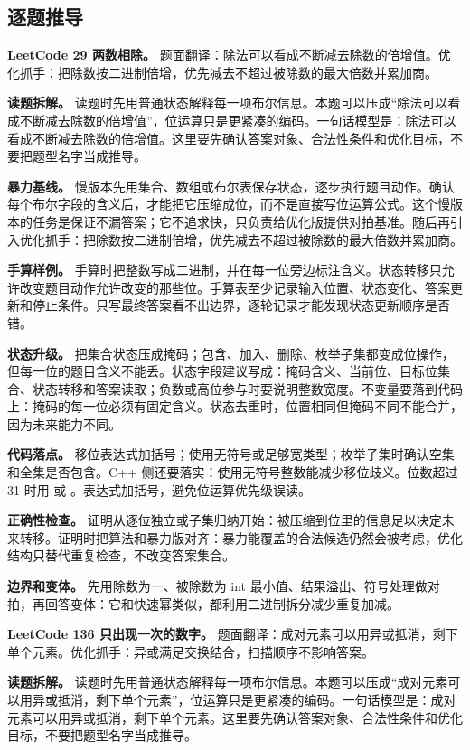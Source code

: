 \subsection{逐题推导}

\noindent\textbf{LeetCode 29 两数相除。} 题面翻译：除法可以看成不断减去除数的倍增值。优化抓手：把除数按二进制倍增，优先减去不超过被除数的最大倍数并累加商。

\textbf{读题拆解。} 读题时先用普通状态解释每一项布尔信息。本题可以压成“除法可以看成不断减去除数的倍增值”，位运算只是更紧凑的编码。一句话模型是：除法可以看成不断减去除数的倍增值。这里要先确认答案对象、合法性条件和优化目标，不要把题型名字当成推导。

\textbf{暴力基线。} 慢版本先用集合、数组或布尔表保存状态，逐步执行题目动作。确认每个布尔字段的含义后，才能把它压缩成位，而不是直接写位运算公式。这个慢版本的任务是保证不漏答案；它不追求快，只负责给优化版提供对拍基准。随后再引入优化抓手：把除数按二进制倍增，优先减去不超过被除数的最大倍数并累加商。

\textbf{手算样例。} 手算时把整数写成二进制，并在每一位旁边标注含义。状态转移只允许改变题目动作允许改变的那些位。手算表至少记录输入位置、状态变化、答案更新和停止条件。只写最终答案看不出边界，逐轮记录才能发现状态更新顺序是否错。

\textbf{状态升级。} 把集合状态压成掩码；包含、加入、删除、枚举子集都变成位操作，但每一位的题目含义不能丢。状态字段建议写成：掩码含义、当前位、目标位集合、状态转移和答案读取；负数或高位参与时要说明整数宽度。不变量要落到代码上：掩码的每一位必须有固定含义。状态去重时，位置相同但掩码不同不能合并，因为未来能力不同。

\textbf{代码落点。} 移位表达式加括号；使用无符号或足够宽类型；枚举子集时确认空集和全集是否包含。C++ 侧还要落实：使用无符号整数能减少移位歧义。位数超过 31 时用  或 。表达式加括号，避免位运算优先级误读。

\textbf{正确性检查。} 证明从逐位独立或子集归纳开始：被压缩到位里的信息足以决定未来转移。证明时把算法和暴力版对齐：暴力能覆盖的合法候选仍然会被考虑，优化结构只替代重复检查，不改变答案集合。

\textbf{边界和变体。} 先用除数为一、被除数为 int 最小值、结果溢出、符号处理做对拍，再回答变体：它和快速幂类似，都利用二进制拆分减少重复加减。

\noindent\textbf{LeetCode 136 只出现一次的数字。} 题面翻译：成对元素可以用异或抵消，剩下单个元素。优化抓手：异或满足交换结合，扫描顺序不影响答案。

\textbf{读题拆解。} 读题时先用普通状态解释每一项布尔信息。本题可以压成“成对元素可以用异或抵消，剩下单个元素”，位运算只是更紧凑的编码。一句话模型是：成对元素可以用异或抵消，剩下单个元素。这里要先确认答案对象、合法性条件和优化目标，不要把题型名字当成推导。

